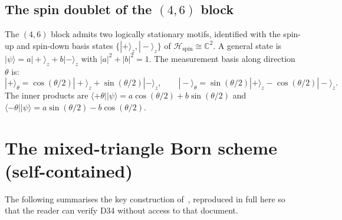 \documentclass[11pt,a4paper]{article}
\theoremstyle{definition}
\newcommand{\Hspin}{\mathcal{H}_{\mathrm{spin}}}
\newcommand{\pket}[1]{|#1\rangle}
\newcommand{\pbra}[1]{\langle#1|}
\begin{document}
\subsection{The spin doublet of the \texorpdfstring{$(4,6)$}{(4,6)} block}

The $(4,6)$ block admits two logically stationary motifs, identified with the spin-up and spin-down basis states $\{\pket{+}_z, \pket{-}_z\}$ of $\Hspin \cong \mathbb{C}^2$. A general state is $\pket{\psi} = a\pket{+}_z + b\pket{-}_z$ with $|a|^2 + |b|^2 = 1$. The measurement basis along direction $\theta$ is:
\begin{equation}
\pket{+}_\theta = \cos(\theta/2)\pket{+}_z + \sin(\theta/2)\pket{-}_z, \qquad \pket{-}_\theta = \sin(\theta/2)\pket{+}_z - \cos(\theta/2)\pket{-}_z.
\label{eq:basis_theta}
\end{equation}
The inner products are $\pbra{+\theta}\pket{\psi} = a\cos(\theta/2) + b\sin(\theta/2)$ and $\pbra{-\theta}\pket{\psi} = a\sin(\theta/2) - b\cos(\theta/2)$.

\section{The mixed-triangle Born scheme (self-contained)}
\label{sec:born_scheme}

The following summarises the key construction of~\cite{Born_PDL_2026}, reproduced in full here so that the reader can verify D34 without access to that document.
\end{document}
